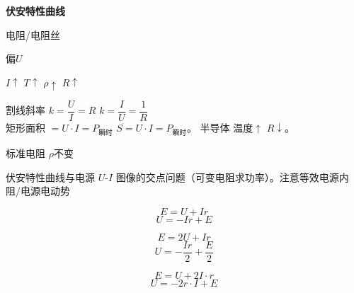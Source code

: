 \textbf{伏安特性曲线}



电阻/电阻丝

偏$U$

$I\uparrow$  $T\uparrow$ $\rho\uparrow$ $R\uparrow$

\noindent 割线斜率 $k=\dfrac{U}{I}=R$ \qquad\qquad $k=\dfrac{I}{U}=\dfrac{1}{R}$\\[4pt]
矩形面积 $=U\cdot I=P_{\text{瞬时}}$ \qquad\quad $S=U\cdot I=P_{\text{瞬时}}$。
半导体 \quad 温度$\uparrow$ $R\downarrow$。

标准电阻 \quad $\rho$不变


伏安特性曲线与电源 $U$-$I$ 图像的交点问题（可变电阻求功率）。\quad 注意等效电源内阻/电源电动势


\[ E=U+Ir \]
\[ U=-Ir+E \]


\[ E=2U+Ir \]
\[ U=-\frac{Ir}{2}+\frac{E}{2} \]

\[ E=U+2I\cdot r \]
\[ U=-2r\cdot I+E \]
